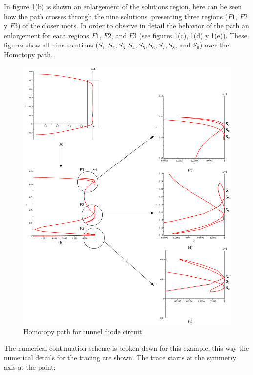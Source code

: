 \documentclass[conference,letterpaper,onecolumn]{IEEEtran}
\begin{document}
In figure \ref{2tunelg}(b) is shown an enlargement of the solutions region, here can be seen how the path crosses through the nine solutions, presenting three regions ($F1$, $F2$ y $F3$) of the closer roots. In order to observe in detail the behavior of the path an enlargement for each regions  $F1$, $F2$,  and $F3$ (see figures \ref{2tunelg}(c), \ref{2tunelg}(d) y \ref{2tunelg}(e)). These figures show all nine solutions ($S_1, S_2, S_3, S_4, S_5, S_6, S_7, S_8$, and $S_9$) over the Homotopy path.

\begin{figure}[hbtp]
\centerline{
\includegraphics[scale=0.25]{figs/2diodos/group.eps} 
}
\caption{Homotopy path for tunnel diode circuit.}
\label{2tunelg}
\end{figure}

The numerical continuation scheme is broken down for this example, this way the numerical details for the tracing are shown. The trace starts at the symmetry axis at the point:
\end{document}
